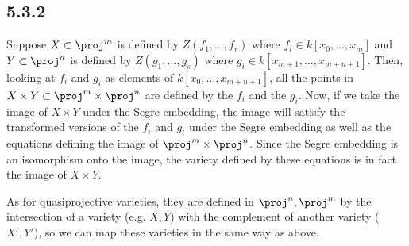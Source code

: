 \documentclass{article}
\begin{document}
\subsection*{5.3.2}
Suppose $X\subset \proj^m$ is defined by $Z(f_1,\ldots,f_r)$ where $f_i\in k[x_0,\ldots,x_m]$ and $Y\subset \proj^n$ is defined by $Z(g_1,\ldots,g_s)$ where $g_i\in k[x_{m+1},\ldots,x_{m+n+1}]$. Then, looking at $f_i$ and $g_i$ as elements of $k[x_0,\ldots,x_{m+n+1}]$, all the points in $X\times Y\subset \proj^m\times\proj^n$ are defined by the $f_i$ and the $g_i$. Now, if we take the image of $X\times Y$ under the Segre embedding, the image will satisfy the transformed versions of the $f_i$ and $g_i$ under the Segre embedding as well as the equations defining the image of $\proj^m\times\proj^n$. Since the Segre embedding is an isomorphism onto the image, the variety defined by these equations is in fact the image of $X\times Y$.

As for quasiprojective varieties, they are defined in $\proj^n,\proj^m$ by the intersection of a variety (e.g. $X,Y$) with the complement of another variety ($X',Y'$), so we can map these varieties in the same way as above.
\end{document}
